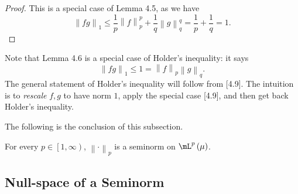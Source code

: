 \documentclass[pmath450]{subfiles}
\begin{document}
    \begin{proof}
        This is a special case of Lemma 4.5, as we have
        \begin{equation*}
            \left\lVert fg \right\rVert_{1} \leq \frac{1}{p}\left\lVert f\right\rVert^p_p + \frac{1}{q}\left\lVert g\right\rVert^q_q = \frac{1}{p} + \frac{1}{q} = 1.
        \end{equation*}
    \end{proof}
    
    \np Note that Lemma 4.6 is a special case of Holder's inequality: it says
    \begin{equation}
        \left\lVert fg \right\rVert_{1} \leq 1 = \left\lVert f\right\rVert_p\left\lVert g\right\rVert_q.
    \end{equation}
    The general statement of Holder's inequality will follow from [4.9]. The intuition is to \textit{rescale} $f,g$ to have norm $1$, apply the special case [4.9], and then get back Holder's inequality.
    
    \np The following is the conclusion of this subsection.

    \begin{prop}{}
        For every $p\in\left[ 1,\infty \right)$, $\left\lVert \cdot\right\rVert_p$ is a seminorm on $\mL^p\left( \mu \right)$.
    \end{prop}


    \subsection{Null-space of a Seminorm}
    
    
    
    
    
    
    
    
    
    
    
    
    
    
    
    
    
    
    
    
    
    
    
    
    
    
    
    
    
    
    
    
    
    
    
    
    
    
    
    
    
    
    
    
\end{document}
